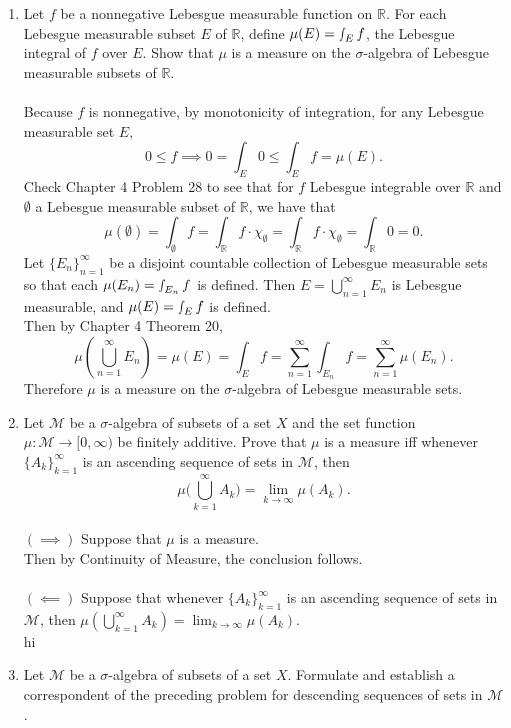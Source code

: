 \begin{enumerate}
	\setcounter{enumi}{0}
	\item Let $f$ be a nonnegative Lebesgue measurable function on $\mathbb{R}$. 
	For each Lebesgue measurable subset $E$ of $\mathbb{R}$, define $\mu(E) = \smallint_E f$, the Lebesgue integral of $f$ over $E$.
	Show that $\mu$ is a measure on the $\sigma$-algebra of Lebesgue measurable subsets of $\mathbb{R}$.\\
	\\Because $f$ is nonnegative, by monotonicity of integration, for any Lebesgue measurable set $E$, 
	\[
		0\le f\implies 0=\int_E 0\le \int_E f=\mu(E).
	\]
	Check Chapter 4 Problem 28 to see that for $f$ Lebesgue integrable over $\mathbb{R}$ and $\emptyset$ a Lebesgue measurable subset of $\mathbb{R}$, we have that
	\[
		\mu(\emptyset)=\int_\emptyset f=\int_\mathbb{R} f\cdot\chi_\emptyset=\int_\mathbb{R} f\cdot\chi_\emptyset=\int_\mathbb{R} 0 = 0.
	\]
	Let $\{E_n\}_{n=1}^\infty$ be a disjoint countable collection of Lebesgue measurable sets so that each $\mu(E_n) = \smallint_{E_n} f$ is defined.
	Then $E=\bigcup_{n=1}^\infty E_n$ is Lebesgue measurable, and $\mu(E) = \smallint_E f$ is defined.
	\\Then by Chapter 4 Theorem 20,
	\[
		\mu(\bigcup_{n=1}^\infty E_n)=\mu(E)=\int_E f =\sum_{n=1}^\infty\int_{E_n}f=\sum_{n=1}^\infty\mu(E_n).
	\]
	Therefore $\mu$ is a measure on the $\sigma$-algebra of Lebesgue measurable sets. 
	\item Let $\mathcal{M}$ be a $\sigma$-algebra of subsets of a set $X$ and the set function $\mu : \mathcal{M} \to [0,\infty)$ be finitely additive.
	Prove that $\mu$ is a measure iff whenever $\{A_k\}_{k=1}^\infty$ is an ascending sequence of sets in $\mathcal{M}$, then
	\[
	\mu \biggl ( \bigcup_{k=1}^\infty A_k \biggr ) = \lim_{k \to \infty} \mu(A_k).	
	\]
	\\$(\implies)$ Suppose that $\mu$ is a measure.\\
	Then by Continuity of Measure, the conclusion follows.\\
	\\$(\impliedby)$ Suppose that whenever $\{A_k\}_{k=1}^\infty$ is an ascending sequence of sets in $\mathcal{M}$, then $\mu ( \bigcup_{k=1}^\infty A_k ) = \lim_{k \to \infty} \mu(A_k)$.\\
	hi
	\item Let $\mathcal{M}$ be a $\sigma$-algebra of subsets of a set $X$. Formulate and establish a correspondent of the preceding problem for descending sequences of sets in $\mathcal{M}$.\\

\end{enumerate}
